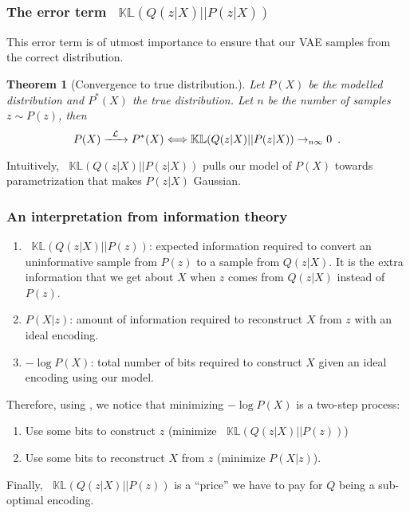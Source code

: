 \documentclass[12pt]{article}
\newtheorem{theorem}{Theorem}
\newcommand*\KL{\mathop{}\!\mathbb{KL}}
\newcommand*\iif{\mathop{}\!\Longleftrightarrow}
\begin{document}
\subsubsection{The error term $\KL(Q(z \vert X) \vert\vert P(z \vert X))$}

This error term is of utmost importance to ensure that our VAE samples from the correct distribution.
%
\begin{theorem}[Convergence to true distribution.]
    Let $P(X)$ be the modelled distribution and $P^*(X)$ the true distribution.
    Let $n$ be the number of samples $z \sim P(z)$, then 
    \begin{equation}
        P(X) \xrightarrow{\enskip \mathcal{L} \enskip} P^*(X) 
        \iif
        \KL(Q(z \vert X) \vert\vert P(z \vert X)) \rightarrow_{n\infty} 0
        \enspace .
    \end{equation}
\end{theorem}
%
Intuitively, $\KL(Q(z \vert X) \vert\vert P(z \vert X))$ pulls our model of $P(X)$ towards parametrization that makes $P(z\vert X)$ Gaussian.

\subsubsection{An interpretation from information theory}
%
\begin{enumerate}
    \item $\KL(Q(z \vert X) \vert\vert P(z))$: expected information required to convert an uninformative sample from $P(z)$ to a sample from $Q(z \vert X)$.
    It is the extra information that we get about $X$ when $z$ comes from $Q(z \vert X)$ instead of $P(z)$.

    \item $P(X \vert z)$: amount of information required to reconstruct $X$ from $z$ with an ideal encoding.
    
    \item $-\log P(X)$: total number of bits required to construct $X$ given an ideal encoding using our model.
\end{enumerate}
%
Therefore, using , we notice that minimizing $-\log P(X)$ is a two-step process:
%
\begin{enumerate}
    \item Use some bits to construct $z$ (minimize $\KL(Q(z \vert X) \vert\vert P(z))$)
    
    \item Use some bits to reconstruct $X$ from $z$ (minimize $P(X \vert z)$).
\end{enumerate}
%
Finally, $\KL(Q(z \vert X) \vert\vert P(z))$ is a ``price'' we have to pay for $Q$ being a sub-optimal encoding.


\end{document}
